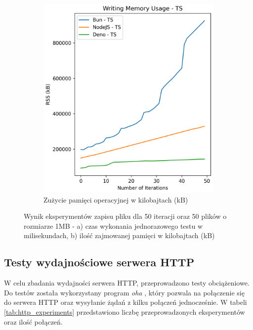\begin{figure}[H]
\begin{subfigure}[b]{0.4\textwidth}
  \end{subfigure}
  \begin{subfigure}[b]{0.4\textwidth}
    \centering
    \includegraphics[width=\textwidth]{Figures/files/files_writing_50_2000_50_ts_memory.png}
    \caption{Zużycie pamięci operacyjnej w kilobajtach (kB)}
    \label{fig:file_e2_writing_ts_memory}
  \end{subfigure}
  \caption{Wynik eksperymentów zapisu pliku dla 50 iteracji oraz 50 plików o rozmiarze 1MB - a) czas wykonania jednorazowego testu w milisekundach, b) ilość zajmowanej pamięci w kilobajtach (kB)}
  \label{fig:file_e2_writing_ts}
\end{figure}

\subsection{Testy wydajnościowe serwera HTTP}
W celu zbadania wydajności serwera HTTP, przeprowadzono testy obciążeniowe. Do testów została wykorzystany program \textit{oha} \cite{oha}, który pozwala na połączenie się do serwera HTTP oraz wysyłanie żądań z kilku połączeń jednocześnie. W tabeli \ref{tab:http_experiments} przedstawiono liczbę przeprowadzonych eksperymentów oraz ilość połączeń.

